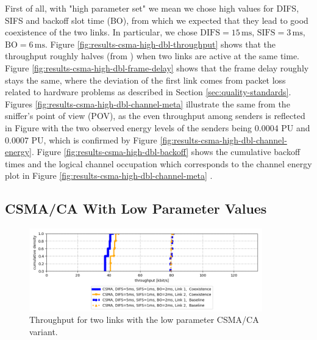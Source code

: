 First of all, with "high parameter set" we mean we chose high values for DIFS, SIFS and backoff slot time (BO), from which we expected that they lead to good coexistence of the two links. In particular, we chose $\text{DIFS}=15 \,\text{ms}$, $\text{SIFS}=3 \,\text{ms}$, $\text{BO}=6 \,\text{ms}$. Figure \ref{fig:results-csma-high-dbl-throughput} shows that the throughput roughly halves (from ) when two links are active at the same time. Figure \ref{fig:results-csma-high-dbl-frame-delay} shows that the frame delay roughly stays the same, where the deviation of the first link comes from packet loss related to hardware problems as described in Section \ref{sec:quality-standards}. Figures \ref{fig:results-csma-high-dbl-channel-meta} illustrate the same from the sniffer's point of view (POV), as the even throughput among senders is reflected in Figure  with the two observed energy levels of the senders being 0.0004 PU and 0.0007 PU, which is confirmed by Figure \ref{fig:results-csma-high-dbl-channel-energy}. Figure \ref{fig:results-csma-high-dbl-backoff} shows the cumulative backoff times and the logical channel occupation which corresponds to the channel energy plot in Figure \ref{fig:results-csma-high-dbl-channel-meta} . 

\clearpage

\subsection{CSMA/CA With Low Parameter Values}
\label{sec:csma-dbl-low}

\begin{figure}[tb]
	\label{fig:results-csma-low-dbl-throughput}
	\begin{center}
		\includegraphics[width=0.9\textwidth]{pictures/results/same_combinations/csma_low_params/throughput_cdf}
	\end{center}
	\caption{Throughput for two links with the low parameter CSMA/CA variant.}
\end{figure}

